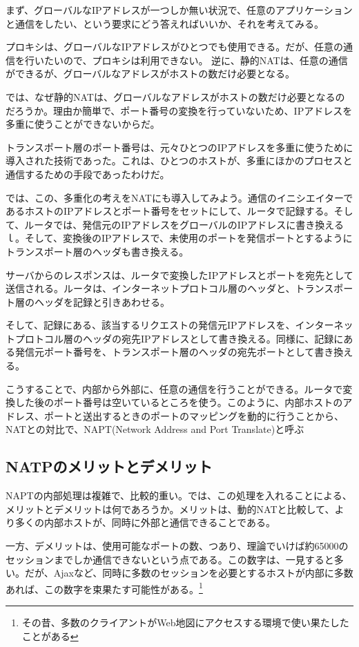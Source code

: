 まず、グローバルなIPアドレスが一つしか無い状況で、任意のアプリケーションと通信をしたい、という要求にどう答えればいいか、それを考えてみる。

プロキシは、グローバルなIPアドレスがひとつでも使用できる。だが、任意の通信を行いたいので、プロキシは利用できない。
逆に、静的NATは、任意の通信ができるが、グローバルなアドレスがホストの数だけ必要となる。

では、なぜ静的NATは、グローバルなアドレスがホストの数だけ必要となるのだろうか。理由か簡単で、ポート番号の変換を行っていないため、IPアドレスを多重に使うことができないからだ。

トランスポート層のポート番号は、元々ひとつのIPアドレスを多重に使うために導入された技術であった。これは、ひとつのホストが、多重にほかのプロセスと通信するための手段であったわけだ。

では、この、多重化の考えをNATにも導入してみよう。通信のイニシエイターであるホストのIPアドレスとポート番号をセットにして、ルータで記録する。そして、ルータでは、発信元のIPアドレスをグローバルのIPアドレスに書き換えるｌ。そして、変換後のIPアドレスで、未使用のポートを発信ポートとするようにトランスポート層のヘッダも書き換える。

サーバからのレスポンスは、ルータで変換したIPアドレスとポートを宛先として送信される。ルータは、インターネットプロトコル層のヘッダと、トランスポート層のヘッダを記録と引きあわせる。

そして、記録にある、該当するリクエストの発信元IPアドレスを、インターネットプロトコル層のヘッダの宛先IPアドレスとして書き換える。同様に、記録にある発信元ポート番号を、トランスポート層のヘッダの宛先ポートとして書き換える。

こうすることで、内部から外部に、任意の通信を行うことができる。ルータで変換した後のポート番号は空いているところを使う。このように、内部ホストのアドレス、ポートと送出するときのポートのマッピングを動的に行うことから、NATとの対比で、NAPT(Network Address and Port Translate)と呼ぶ
\subsection{NATPのメリットとデメリット}
NAPTの内部処理は複雑で、比較的重い。では、この処理を入れることによる、メリットとデメリットは何であろうか。メリットは、動的NATと比較して、より多くの内部ホストが、同時に外部と通信できることである。

一方、デメリットは、使用可能なポートの数、つあり、理論でいけば約65000のセッションまでしか通信できないという点である。この数字は、一見すると多い。だが、Ajaxなど、同時に多数のセッションを必要とするホストが内部に多数あれば、この数字を束果たす可能性がある。\footnote{その昔、多数のクライアントがWeb地図にアクセスする環境で使い果たしたことがある}

